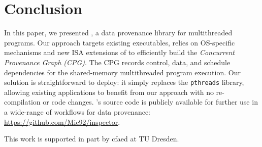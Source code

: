 \section{Conclusion}
\label{sec:conclusion}

In this paper, we presented \projecttitle, a data provenance library for multithreaded programs. Our approach targets existing executables, relies on OS-specific mechanisms and new ISA extensions of \intelpt  to efficiently build the {\em Concurrent Provenance Graph (CPG)}. The CPG records control, data, and schedule dependencies for the shared-memory multithreaded program execution. Our solution is straightforward to deploy: it simply replaces the {\tt pthreads} library, allowing existing applications to benefit from our approach with no re-compilation or code changes.  \projecttitle's source code is publicly available for further use in a wide-range of workflows for data provenance:  \href{https://github.com/Mic92/inspector}{ https://github.com/Mic92/inspector}.

 This work is supported in part by cfaed at TU Dresden.

 
